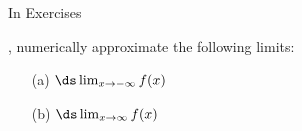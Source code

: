 {\noindent In Exercises}
{, numerically approximate the following limits:
	\begin{enumerate}
	\item[(a)]		$\ds \lim_{x\to -\infty} f(x)$
	\item[(b)]		$\ds \lim_{x\to \infty} f(x)$
	\end{enumerate}
}
